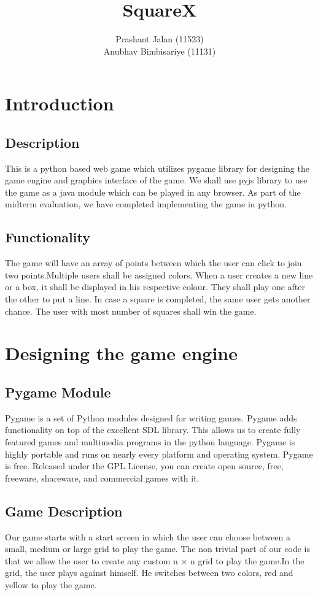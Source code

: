 \documentclass[12pt, a4paper]{report}
\begin{document}
\title{SquareX}
\author{Prashant Jalan (11523)\\
Anubhav Bimbisariye (11131)}
\maketitle
\tableofcontents

\chapter{Introduction}
\section{Description}
This is a python based web game which utilizes pygame library for designing the game engine and graphics interface of the game. We shall use pyjs library to use the game as a java module which can be played in any browser. As part of the midterm evaluation, we have completed implementing the game in python.
\section{Functionality}
The game will have an array of points between which the user can click to join two points.Multiple users shall be assigned colors. When a user creates a new line or a box, it shall be displayed in his respective colour. They shall play one after the other to put a line. In case a square is completed, the same user gets another chance.
The user with most number of squares shall win the game.

\chapter{Designing the game engine}
\section{Pygame Module}
Pygame is a set of Python modules designed for writing games. Pygame adds functionality on top of the excellent SDL library. This allows us to create fully featured games and multimedia programs in the python language. Pygame is highly portable and runs on nearly every platform and operating system. Pygame is free. Released under the GPL License, you can create open source, free, freeware, shareware, and commercial games with it.

\section{Game Description}
Our game starts with a start screen in which the user can choose between a small, medium or large grid to play the game. The non trivial part of our code is that we allow the user to create any custom n $\times$ n grid to play the game.In the grid, the user plays against himself. He switches between two colors, red and yellow to play the game.
\end{document}
